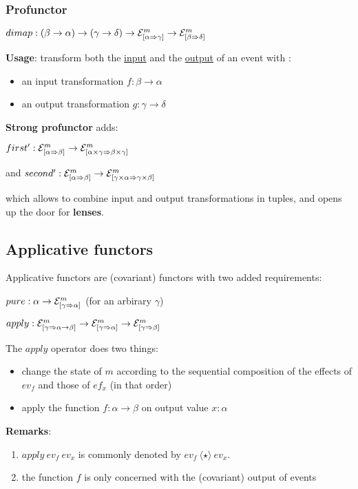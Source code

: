 \documentclass{article}
\newcommand{\EV}[3]{\ensuremath{{\cal{E}}^{#1}_{[#2 \Rightarrow #3]}}}
\newcommand{\APPLY}{\ensuremath{\langle \star \rangle}}
\begin{document}
\subsubsection*{Profunctor}

$dimap: (\beta \rightarrow \alpha) \rightarrow (\gamma \rightarrow \delta) \rightarrow  \EV{m}{\alpha}{\gamma} \rightarrow \EV{m}{\beta}{\delta}$

\textbf{Usage}: transform both the \underline{input} and the \underline{output} of an event with :
\begin{itemize}
\item an input transformation $f : \beta \rightarrow \alpha$
\item an output transformation $g : \gamma \rightarrow \delta$
\end{itemize}

\textbf{Strong profunctor} adds:

$first' : \EV{m}{\alpha}{\beta} \rightarrow \EV{m}{\alpha \times \gamma}{\beta \times \gamma}$

and $second' : \EV{m}{\alpha}{\beta} \rightarrow \EV{m}{\gamma \times \alpha}{\gamma \times \beta}$

which allows to combine input and output transformations in tuples, and opens up the door for \textbf{lenses}.

\subsection{Applicative functors}

Applicative functors are (covariant) functors with two added requirements:

$pure: \alpha \rightarrow \EV{m}{\gamma}{\alpha}$  (for an arbirary $\gamma$)

$apply: \EV{m}{\gamma}{\alpha \rightarrow \beta} \rightarrow \EV{m}{\gamma}{\alpha} \rightarrow \EV{m}{\gamma}{\beta}$


The $apply$ operator does two things:

\begin{itemize}
\item change the state of $m$ according to the sequential composition of the effects of $ev_f$ and those of $ef_x$  (in that order)
\item apply the function $f : \alpha \rightarrow \beta$ on output value $x : \alpha$
\end{itemize}

\textbf{Remarks}:
\begin{enumerate}
\item $apply~ev_f~ev_x$ is commonly denoted by $ev_f~\APPLY~ev_x$.
\item the function $f$ is only concerned with the (covariant) output of events
\end{enumerate}
\end{document}
